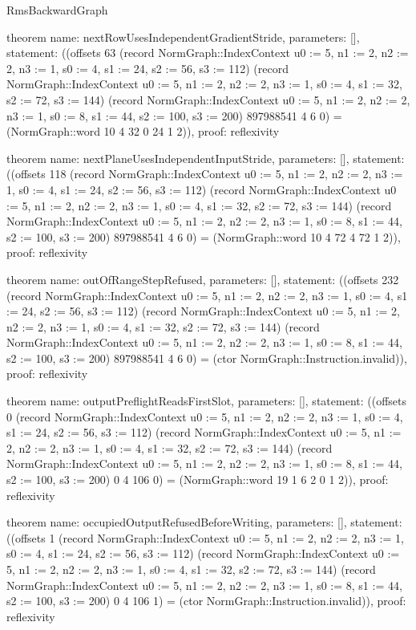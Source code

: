 \begin{lexlean}{RmsBackwardGraph}
\begin{semanticmodule}
theorem{
  name: nextRowUsesIndependentGradientStride,
  parameters: [],
  statement: ((offsets 63 (record NormGraph::IndexContext {u0 := 5, n1 := 2, n2 := 2, n3 := 1, s0 := 4, s1 := 24, s2 := 56, s3 := 112}) (record NormGraph::IndexContext {u0 := 5, n1 := 2, n2 := 2, n3 := 1, s0 := 4, s1 := 32, s2 := 72, s3 := 144}) (record NormGraph::IndexContext {u0 := 5, n1 := 2, n2 := 2, n3 := 1, s0 := 8, s1 := 44, s2 := 100, s3 := 200}) 897988541 4 6 0) = (NormGraph::word 10 4 32 0 24 1 2)),
  proof: reflexivity{}
}

theorem{
  name: nextPlaneUsesIndependentInputStride,
  parameters: [],
  statement: ((offsets 118 (record NormGraph::IndexContext {u0 := 5, n1 := 2, n2 := 2, n3 := 1, s0 := 4, s1 := 24, s2 := 56, s3 := 112}) (record NormGraph::IndexContext {u0 := 5, n1 := 2, n2 := 2, n3 := 1, s0 := 4, s1 := 32, s2 := 72, s3 := 144}) (record NormGraph::IndexContext {u0 := 5, n1 := 2, n2 := 2, n3 := 1, s0 := 8, s1 := 44, s2 := 100, s3 := 200}) 897988541 4 6 0) = (NormGraph::word 10 4 72 4 72 1 2)),
  proof: reflexivity{}
}

theorem{
  name: outOfRangeStepRefused,
  parameters: [],
  statement: ((offsets 232 (record NormGraph::IndexContext {u0 := 5, n1 := 2, n2 := 2, n3 := 1, s0 := 4, s1 := 24, s2 := 56, s3 := 112}) (record NormGraph::IndexContext {u0 := 5, n1 := 2, n2 := 2, n3 := 1, s0 := 4, s1 := 32, s2 := 72, s3 := 144}) (record NormGraph::IndexContext {u0 := 5, n1 := 2, n2 := 2, n3 := 1, s0 := 8, s1 := 44, s2 := 100, s3 := 200}) 897988541 4 6 0) = (ctor NormGraph::Instruction.invalid)),
  proof: reflexivity{}
}

theorem{
  name: outputPreflightReadsFirstSlot,
  parameters: [],
  statement: ((offsets 0 (record NormGraph::IndexContext {u0 := 5, n1 := 2, n2 := 2, n3 := 1, s0 := 4, s1 := 24, s2 := 56, s3 := 112}) (record NormGraph::IndexContext {u0 := 5, n1 := 2, n2 := 2, n3 := 1, s0 := 4, s1 := 32, s2 := 72, s3 := 144}) (record NormGraph::IndexContext {u0 := 5, n1 := 2, n2 := 2, n3 := 1, s0 := 8, s1 := 44, s2 := 100, s3 := 200}) 0 4 106 0) = (NormGraph::word 19 1 6 2 0 1 2)),
  proof: reflexivity{}
}

theorem{
  name: occupiedOutputRefusedBeforeWriting,
  parameters: [],
  statement: ((offsets 1 (record NormGraph::IndexContext {u0 := 5, n1 := 2, n2 := 2, n3 := 1, s0 := 4, s1 := 24, s2 := 56, s3 := 112}) (record NormGraph::IndexContext {u0 := 5, n1 := 2, n2 := 2, n3 := 1, s0 := 4, s1 := 32, s2 := 72, s3 := 144}) (record NormGraph::IndexContext {u0 := 5, n1 := 2, n2 := 2, n3 := 1, s0 := 8, s1 := 44, s2 := 100, s3 := 200}) 0 4 106 1) = (ctor NormGraph::Instruction.invalid)),
  proof: reflexivity{}
}
\end{semanticmodule}
\end{lexlean}
